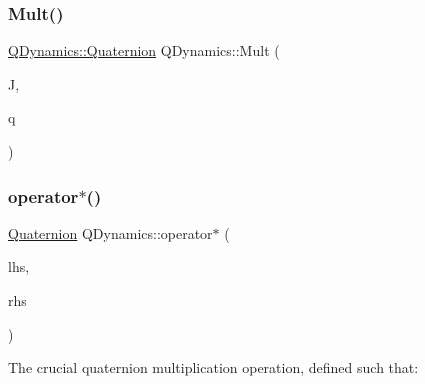 \mbox{\label{namespaceQDynamics_a0b043bd2021eaeb8b6580cef4fcc667c}} 
\subsubsection{\texorpdfstring{Mult()}{Mult()}}
{\footnotesize\ttfamily \hyperlink{classQDynamics_1_1Quaternion}{Q\+Dynamics\+::\+Quaternion} Q\+Dynamics\+::\+Mult (\begin{DoxyParamCaption}\item[{const \hyperlink{classJSL_1_1Vector}{J\+S\+L\+::\+Vector} \&}]{J,  }\item[{const \hyperlink{classQDynamics_1_1Quaternion}{Q\+Dynamics\+::\+Quaternion} \&}]{q }\end{DoxyParamCaption})}

\mbox{\label{namespaceQDynamics_ac40010112506831ced816640def9bc85}} 
\subsubsection{\texorpdfstring{operator$\ast$()}{operator*()}\hspace{0.1cm}{\footnotesize\ttfamily [1/2]}}
{\footnotesize\ttfamily \hyperlink{classQDynamics_1_1Quaternion}{Quaternion} Q\+Dynamics\+::operator$\ast$ (\begin{DoxyParamCaption}\item[{const \hyperlink{classQDynamics_1_1Quaternion}{Quaternion} \&}]{lhs,  }\item[{const \hyperlink{classQDynamics_1_1Quaternion}{Quaternion} \&}]{rhs }\end{DoxyParamCaption})\hspace{0.3cm}{\ttfamily [inline]}}



The crucial quaternion multiplication operation, defined such that\+: 

